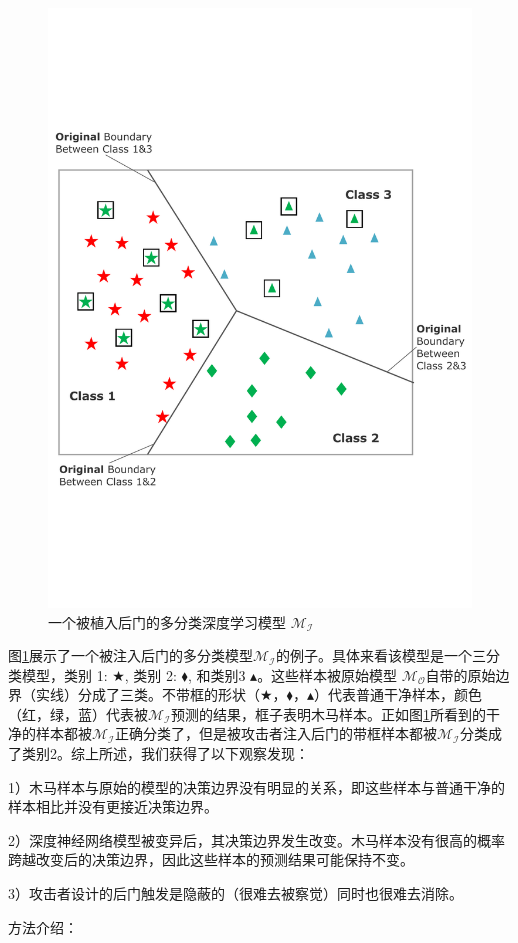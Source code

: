 \documentclass[fontset=macnew,UTF8]{article} %
\begin{document}
\begin{figure}[h]
	\centering
	\includegraphics[width=0.48\linewidth]{Backdoor.pdf}
	\caption{一个被植入后门的多分类深度学习模型 $\mathcal{M}_\mathcal{I}$}
	\label{Backdoor_injected_model}
\end{figure}

图\ref{Backdoor_injected_model}展示了一个被注入后门的多分类模型$\mathcal{M}_\mathcal{I}$的例子。具体来看该模型是一个三分类模型，类别 1: $\bigstar$, 类别 2: $\blacklozenge$, 和类别3 $\blacktriangle$。这些样本被原始模型 $\mathcal{M}_\mathcal{O}$自带的原始边界（实线）分成了三类。不带框的形状（$\bigstar$，$\blacklozenge$，$\blacktriangle$）代表普通干净样本，颜色（红，绿，蓝）代表被$\mathcal{M}_\mathcal{I}$预测的结果，框子表明木马样本。正如图\ref{Backdoor_injected_model}所看到的干净的样本都被$\mathcal{M}_\mathcal{I}$正确分类了，但是被攻击者注入后门的带框样本都被$\mathcal{M}_\mathcal{I}$分类成了类别2。综上所述，我们获得了以下观察发现：

1）木马样本与原始的模型的决策边界没有明显的关系，即这些样本与普通干净的样本相比并没有更接近决策边界。

2）深度神经网络模型被变异后，其决策边界发生改变。木马样本没有很高的概率跨越改变后的决策边界，因此这些样本的预测结果可能保持不变。

3）攻击者设计的后门触发是隐蔽的（很难去被察觉）同时也很难去消除。


方法介绍：
\end{document}
